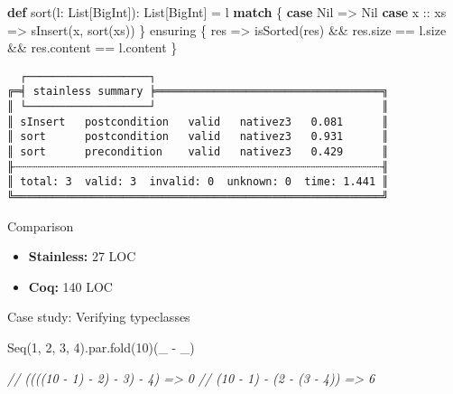 \documentclass[
  ignorenonframetext,
]{beamer}
\newenvironment{Shaded}{}{}
\newcommand{\CommentTok}[1]{\textcolor[rgb]{0.38,0.63,0.69}{\textit{#1}}}
\newcommand{\DecValTok}[1]{\textcolor[rgb]{0.25,0.63,0.44}{#1}}
\newcommand{\FunctionTok}[1]{\textcolor[rgb]{0.02,0.16,0.49}{#1}}
\newcommand{\KeywordTok}[1]{\textcolor[rgb]{0.00,0.44,0.13}{\textbf{#1}}}
\newcommand{\NormalTok}[1]{#1}
\providecommand{\tightlist}{%
  \setlength{\itemsep}{0pt}\setlength{\parskip}{0pt}}
\begin{document}
\begin{frame}[fragile]

\begin{Shaded}
\begin{Highlighting}[]
\KeywordTok{def} \FunctionTok{sort}\NormalTok{(l: List[BigInt]): List[BigInt] = l }\KeywordTok{match}\NormalTok{ \{}
  \KeywordTok{case}\NormalTok{ Nil     => Nil}
  \KeywordTok{case}\NormalTok{ x :: xs => }\FunctionTok{sInsert}\NormalTok{(x, }\FunctionTok{sort}\NormalTok{(xs))}
\NormalTok{\} ensuring \{ res =>}
  \FunctionTok{isSorted}\NormalTok{(res) &&}
\NormalTok{  res.}\FunctionTok{size}\NormalTok{ == l.}\FunctionTok{size}\NormalTok{ &&}
\NormalTok{  res.}\FunctionTok{content}\NormalTok{ == l.}\FunctionTok{content}
\NormalTok{\}}
\end{Highlighting}
\end{Shaded}

\end{frame}

\begin{frame}[fragile]

\begin{verbatim}
  ┌───────────────────┐
╔═╡ stainless summary ╞═══════════════════════════════════╗
║ └───────────────────┘                                   ║
║ sInsert   postcondition   valid   nativez3   0.081      ║
║ sort      postcondition   valid   nativez3   0.931      ║
║ sort      precondition    valid   nativez3   0.429      ║
╟┄┄┄┄┄┄┄┄┄┄┄┄┄┄┄┄┄┄┄┄┄┄┄┄┄┄┄┄┄┄┄┄┄┄┄┄┄┄┄┄┄┄┄┄┄┄┄┄┄┄┄┄┄┄┄┄┄╢
║ total: 3  valid: 3  invalid: 0  unknown: 0  time: 1.441 ║
╚═════════════════════════════════════════════════════════╝
\end{verbatim}

\end{frame}

\begin{frame}{Comparison}
\protect\hypertarget{comparison}{}

\begin{itemize}
\tightlist
\item
  \textbf{Stainless:} 27 LOC
\item
  \textbf{Coq:} 140 LOC
\end{itemize}

\end{frame}

\begin{frame}[fragile]{Case study: Verifying typeclasses}
\protect\hypertarget{case-study-verifying-typeclasses}{}

\begin{Shaded}
\begin{Highlighting}[]
\NormalTok{Seq(}\DecValTok{1}\NormalTok{, }\DecValTok{2}\NormalTok{, }\DecValTok{3}\NormalTok{, }\DecValTok{4}\NormalTok{).}\FunctionTok{par}\NormalTok{.}\FunctionTok{fold}\NormalTok{(}\DecValTok{10}\NormalTok{)(_ - _)}

\CommentTok{// ((((10 - 1) - 2) - 3) - 4) => 0}
\CommentTok{// (10 - 1) - (2 - (3 - 4))   => 6}
\end{Highlighting}
\end{Shaded}

\end{frame}
\end{document}
